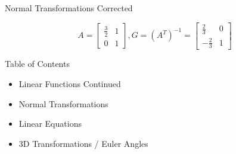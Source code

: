 \documentclass{beamer}
\begin{document}
\begin{frame}{Normal Transformations Corrected}

\[ A = \left[ \begin{array}{cc} \frac{3}{2} & 1 \\ 0 & 1 \end{array} \right], G = (A^T)^{-1} =  \left[ \begin{array}{cc} \frac{2}{3} & 0 \\ -\frac{2}{3} & 1 \end{array} \right] \]

\begin{figure}[t]
    \captionsetup[subfloat]{labelformat=empty}
	\centering
\end{figure}

\end{frame}


\begin{frame}{Table of Contents}

\begin{itemize}[label=$\vartriangleright$]
	\item Linear Functions Continued
	\item Normal Transformations
\end{itemize}
\begin{itemize}[label=$\blacktriangleright$]
	\item Linear Equations
\end{itemize}

\begin{itemize}[label=$\vartriangleright$]
    \item 3D Transformations / Euler Angles
\end{itemize}

\end{frame}
\end{document}
